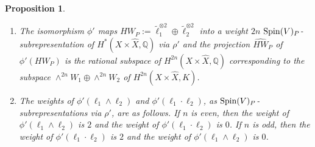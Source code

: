 \documentclass[12pt]{amsart}
\numberwithin{equation}{subsection}
\theoremstyle{plain}
\newtheorem{prop}[thm]{Proposition}
\theoremstyle{definition}
\newcommand{\QQ}{{\mathbb Q}}
\newcommand{\Spin}{{\rm Spin}}
\begin{document}
\begin{prop}
\label{prop-the-orlov-image-of-HW-P-projects-into-the-3-dimensional-space-of-HW-classes}
\begin{enumerate}
\item
\label{prop-item-HW-P-maps-to-a-weight-2n-subrepresentation}
The isomorphism $\phi'$ maps $HW_P:=\tilde{\ell}_1^{\otimes 2}\oplus \tilde{\ell}_2^{\otimes 2}$
into a weight $2n$ $\Spin(V)_P$-subrepresentation of $H^*(X\times\hat{X},\QQ)$ via $\rho'$ and the projection 
$\hat{HW}_P$ of $\phi'(HW_P)$ is the rational subspace of $H^{2n}(X\times\hat{X},\QQ)$ corresponding to the subspace
$\wedge^{2n}W_1\oplus\wedge^{2n}W_2$ of $H^{2n}(X\times\hat{X},K)$.
\item
\label{prop-item-weight-2-subrepresentation}
The weights of $\phi'(\ell_1\wedge\ell_2)$ and $\phi'(\ell_1\cdot\ell_2)$, as $\Spin(V)_P$-subrepresentations via $\rho'$, are as follows.
If $n$ is even, then the weight of $\phi'(\ell_1\wedge\ell_2)$ is $2$  
and the weight of $\phi'(\ell_1\cdot\ell_2)$ is $0$.
If $n$ is odd, then the weight of $\phi'(\ell_1\cdot\ell_2)$ is $2$ 
and the weight of $\phi'(\ell_1\wedge\ell_2)$ is $0$.
\end{enumerate}
\end{prop}
\end{document}
